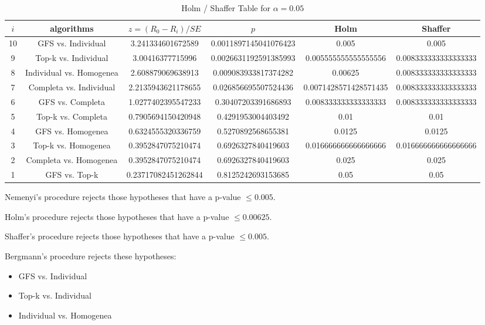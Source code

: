 \documentclass[a4paper,10pt]{article}
\begin{document}
\begin{landscape}
\begin{table}[!htp]
\centering\tiny
\caption{Holm / Shaffer Table for $\alpha=0.05$}
\begin{tabular}{cccccc}
$i$&algorithms&$z=(R_0 - R_i)/SE$&$p$&Holm&Shaffer\\
\hline
10&GFS vs. Individual&3.241334601672589&0.0011897145041076423&0.005&0.005\\
9&Top-k vs. Individual&3.00416377715996&0.0026631192591385993&0.005555555555555556&0.008333333333333333\\
8&Individual vs. Homogenea&2.608879069638913&0.009083933817374282&0.00625&0.008333333333333333\\
7&Completa vs. Individual&2.2135943621178655&0.026856695507524436&0.0071428571428571435&0.008333333333333333\\
6&GFS vs. Completa&1.0277402395547233&0.30407203391686893&0.008333333333333333&0.008333333333333333\\
5&Top-k vs. Completa&0.7905694150420948&0.4291953004403492&0.01&0.01\\
4&GFS vs. Homogenea&0.6324555320336759&0.5270892568655381&0.0125&0.0125\\
3&Top-k vs. Homogenea&0.3952847075210474&0.6926327840419603&0.016666666666666666&0.016666666666666666\\
2&Completa vs. Homogenea&0.3952847075210474&0.6926327840419603&0.025&0.025\\
1&GFS vs. Top-k&0.23717082451262844&0.8125242693153685&0.05&0.05\\
\hline
\end{tabular}
\end{table}
Nemenyi's procedure rejects those hypotheses that have a p-value $\le0.005$.


Holm's procedure rejects those hypotheses that have a p-value $\le0.00625$.


Shaffer's procedure rejects those hypotheses that have a p-value $\le0.005$.


Bergmann's procedure rejects these hypotheses:


\begin{itemize}


\item GFS vs. Individual
\item Top-k vs. Individual
\item Individual vs. Homogenea
\end{itemize}



\end{landscape}
\end{document}

